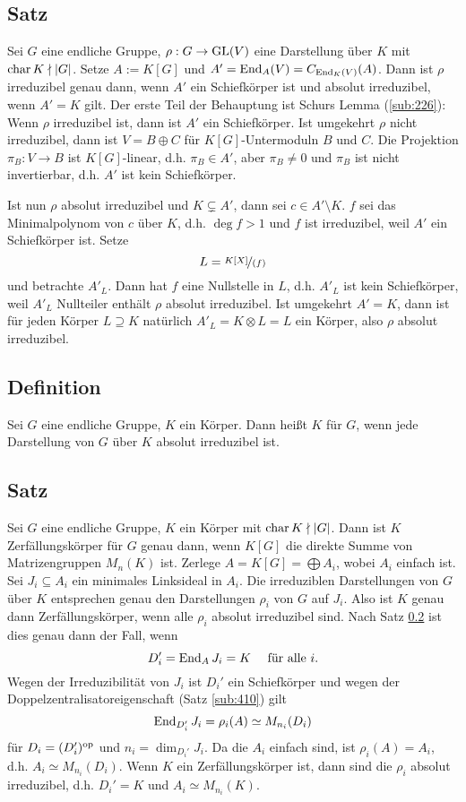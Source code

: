 \subsection{Satz} %
\label{sub:421}
Sei $G$ eine endliche Gruppe, $\rho :G  \to \GL(V)$ eine Darstellung über $K$ mit $\Char K \nmid \abs*{G}$. Setze $A := K[G]$ und $A' = \End_A(V)= C_{\End_K(V)}(A)$. Dann
ist $\rho$ irreduzibel genau dann, wenn $A'$ ein Schiefkörper ist und absolut irreduzibel, wenn $A'=K$ gilt.
Der erste Teil der Behauptung ist Schurs Lemma (\ref{sub:226}): Wenn $\rho$ irreduzibel ist, dann ist $A'$ ein Schiefkörper. Ist umgekehrt $\rho$ nicht irreduzibel, dann ist
$V= B \oplus C$ für $K[G]$-Untermoduln $B$ und $C$. Die Projektion $\pi_B :V \to B$ ist $K[G]$-linear, d.h. $\pi_B \in A'$, aber $\pi_B \not= 0$ und $\pi_B$ ist nicht 
invertierbar, d.h. $A'$ ist kein Schiefkörper.

Ist nun $\rho$ absolut irreduzibel und $K \subsetneq A'$, dann sei $c \in A' \setminus K$. $f $ sei das Minimalpolynom von $c$ über $K$, d.h. $\deg f > 1$ und $f$ ist
irreduzibel, weil $A'$ ein Schiefkörper ist. Setze
\[
	L= \nicefrac{K[X]}{(f)}
\]
und betrachte $A'_L$. Dann hat $f$ eine Nullstelle in $L$, d.h. $A'_L$ ist kein Schiefkörper, weil $A'_L$ Nullteiler enthält \light $\rho$ absolut irreduzibel. Ist umgekehrt
$A'=K$, dann ist für jeden Körper $L \supseteq K$ natürlich $A'_L = K \otimes L = L$ ein Körper, also $\rho$ absolut irreduzibel. \bewende

\subsection[Definition: Zerfällungskörper einer Gruppe]{Definition} %
\label{sub:422}
Sei $G$ eine endliche Gruppe, $K$ ein Körper. Dann heißt $K$  für $G$, wenn jede Darstellung von $G$ über $K$ absolut irreduzibel ist. 

\subsection{Satz} %
\label{sub:423}
Sei $G$ eine endliche Gruppe, $K$ ein Körper mit $\Char K \nmid \abs*{G}$. Dann ist $K$ Zerfällungskörper für $G$ genau dann, wenn $K[G]$ die direkte Summe von 
Matrizengruppen $M_n(K)$ ist.
Zerlege $A=K[G]= \bigoplus A_i$, wobei $A_i$ einfach ist. Sei $J_i \subseteq A_i$ ein minimales Linksideal in $A_i$. Die irreduziblen Darstellungen von $G$ über $K$
entsprechen genau den Darstellungen $\rho_i$ von $G$ auf $J_i$. Also ist $K$ genau dann Zerfällungskörper, wenn alle $\rho_i$ absolut irreduzibel sind. Nach Satz 
\ref{sub:422} ist dies genau dann der Fall, wenn 
\[
	D_i' = \End_A J_i = K \quad \text{ für alle }i.
\]
Wegen der Irreduzibilität von $J_i$ ist $D_i'$ ein Schiefkörper und wegen der Doppelzentralisatoreigenschaft (Satz \ref{sub:410}) gilt
\[
	\End_{D_i'} J_i = \rho_i(A) \simeq M_{n_i}(D_i)
\]
für $D_i = (D_i')^\op$ und $n_i = \dim_{D_i'} J_i$. Da die $A_i$ einfach sind, ist $\rho_i(A)=A_i$, d.h. $A_i \simeq M_{n_i}(D_i)$. Wenn $K$ ein Zerfällungskörper ist, dann
sind die $\rho_i$ absolut irreduzibel, d.h. $D_i' = K$ und $A_i \simeq M_{n_i}(K)$.

